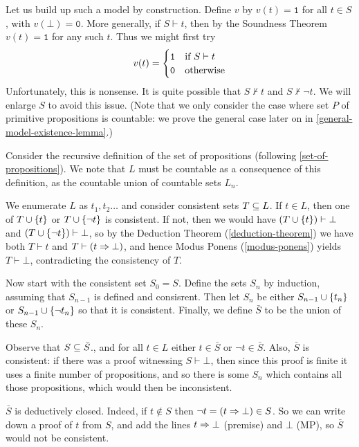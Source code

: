 \documentclass{article}
\begin{document}
\begin{prf}
    Let us build up such a model by construction. Define $v$ by $v(t) = \texttt{1}$ for all $t \in S$, with $v(\bot) = \texttt{0}$. More generally, if $S \vdash t$, then by the Soundness Theorem $v(t) = \texttt{1}$ for any such $t$. Thus we might first try
    \[
	v(t) = \begin{cases}
		\texttt{1} & \text{if } S \vdash t \\
		\texttt{0} & \!\mathrel{\, \text{otherwise}}
	\end{cases}
	\]
	Unfortunately, this is nonsense. It is quite possible that $S \not\vdash t$ and $S \not\vdash \lnot t$. We will enlarge $S$ to avoid this issue. (Note that we only consider the case where set $P$ of primitive propositions is countable: we prove the general case later on in \ref{general-model-existence-lemma}.)
	
	Consider the recursive definition of the set of propositions (following \ref{set-of-propositions}). We note that $L$ must be countable as a consequence of this definition, as the countable union of countable sets $L_n$.
	
	We enumerate $L$ as $t_1, t_2 \dots$ and consider consistent sets $T \subseteq L$. If $t \in L$, then one of $T \cup \left\lbrace t \right\rbrace$ or $T \cup \left\lbrace \lnot t \right\rbrace$ is consistent. If not, then we would have $(T \cup \left\lbrace t \right\rbrace) \vdash \bot$ and $(T \cup \left\lbrace \lnot t \right\rbrace) \vdash \bot$, so by the Deduction Theorem (\ref{deduction-theorem}) we have both $T \vdash t$ and $T \vdash (t \Rightarrow \bot)$, and hence Modus Ponens (\ref{modus-ponens}) yields $T \vdash \bot$, contradicting the consistency of $T$.
	
	Now start with the consistent set $S_0 = S$. Define the sets $S_n$ by induction, assuming that $S_{n-1}$ is defined and consisrent. Then let $S_n$ be either $S_{n-1} \cup \left\lbrace t_n \right\rbrace$ or $S_{n-1} \cup \left\lbrace \lnot t_n \right\rbrace$ so that it is consistent. Finally, we define $\bar S$ to be the union of these $S_n$.
	
	Observe that $S \subseteq \bar S$., and for all $t \in L$ either $t \in \bar S$ or $\lnot t \in \bar S$. Also, $\bar S$ is consistent: if there was a proof witnessing $S \vdash \bot$, then since this proof is finite it uses a finite number of propositions, and so there is some $S_n$ which contains all those propositions, which would then be inconsistent.
	
	$\bar S$ is deductively closed. Indeed, if $t \notin S$ then $\lnot t = (t \Rightarrow \bot) \in S$. So we can write down a proof of $t$ from $S$, and add the lines $t \Rightarrow \bot$ (premise) and $\bot$ (MP), so $\bar S$ would not be consistent.
	

\end{prf}
\end{document}
